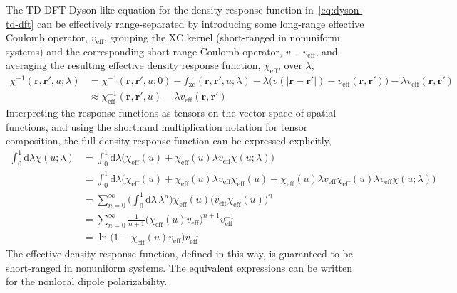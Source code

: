 The TD-DFT Dyson-like equation for the density response function in~\eqref{eq:dyson-td-dft} can be effectively range-separated by introducing some long-range effective Coulomb operator, $v_\text{eff}$, grouping the XC kernel (short-ranged in nonuniform systems) and the corresponding short-range Coulomb operator, $v-v_\text{eff}$, and averaging the resulting effective density response function, $\chi_\text{eff}$, over $\lambda$,
\begin{equation}
\begin{aligned}
  \chi^{-1}(\mathbf r,\mathbf r',u;\lambda)&=\chi^{-1}(\mathbf r,\mathbf r',u;0)-f_\text{xc}(\mathbf r,\mathbf r',u;\lambda)-\lambda\big(v(|\mathbf r-\mathbf r'|)-v_\text{eff}(\mathbf r,\mathbf r')\!\big)-\lambda v_\text{eff}(\mathbf r,\mathbf r') \\
  &\approx\chi^{-1}_\text{eff}(\mathbf r,\mathbf r',u)-\lambda v_\text{eff}(\mathbf r,\mathbf r')
\end{aligned}
\label{eq:dyson}
\end{equation}
Interpreting the response functions as tensors on the vector space of spatial functions, and using the shorthand multiplication notation for tensor composition, the full density response function can be expressed explicitly,
\begin{equation}
\begin{aligned}
  \textstyle\int_0^1\mathrm d\lambda\chi(u;\lambda)&=\textstyle\int_0^1\mathrm d\lambda\big(\chi_\text{eff}(u)+\chi_\text{eff}(u)\lambda v_\text{eff}\chi(u;\lambda)\!\big) \\
  &=\textstyle\int_0^1\mathrm d\lambda\big(\chi_\text{eff}(u)+\chi_\text{eff}(u)\lambda v_\text{eff}\chi_\text{eff}(u)+\chi_\text{eff}(u)\lambda v_\text{eff}\chi_\text{eff}(u)\lambda v_\text{eff}\chi(u;\lambda)\!\big) \\
  &=\sum_{n=0}^\infty\big(\textstyle\int_0^1\mathrm d\lambda\,\lambda^n\big)\chi_\text{eff}(u)\big(v_\text{eff}\chi_\text{eff}(u)\!\big)^n \\
  &=\sum_{n=0}^\infty\frac{1}{n+1}\big(\chi_\text{eff}(u)v_\text{eff}\big)^{n+1}v_\text{eff}^{-1} \\
  &=\ln\big(1-\chi_\text{eff}(u)v_\text{eff}\big)v_\text{eff}^{-1}
\end{aligned}
\end{equation}
The effective density response function, defined in this way, is guaranteed to be short-ranged in nonuniform systems.
The equivalent expressions can be written for the nonlocal dipole polarizability.

